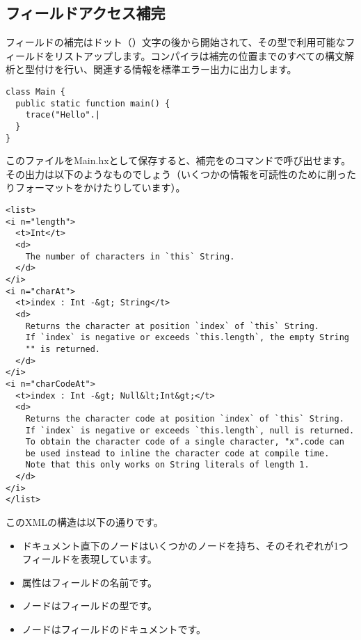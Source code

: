 \subsection{フィールドアクセス補完}
\label{cr-completion-field-access}

フィールドの補完はドット（）文字の後から開始されて、その型で利用可能なフィールドをリストアップします。コンパイラは補完の位置までのすべての構文解析と型付けを行い、関連する情報を標準エラー出力に出力します。

\begin{lstlisting}
class Main {
  public static function main() {
    trace("Hello".|
  }
}
\end{lstlisting}

このファイルをMain.hxとして保存すると、補完をのコマンドで呼び出せます。その出力は以下のようなものでしょう（いくつかの情報を可読性のために削ったりフォーマットをかけたりしています）。

\begin{lstlisting}
<list>
<i n="length">
  <t>Int</t>
  <d>
    The number of characters in `this` String.
  </d>
</i>
<i n="charAt">
  <t>index : Int -&gt; String</t>
  <d>
    Returns the character at position `index` of `this` String.
    If `index` is negative or exceeds `this.length`, the empty String
    "" is returned.
  </d>
</i>
<i n="charCodeAt">
  <t>index : Int -&gt; Null&lt;Int&gt;</t>
  <d>
    Returns the character code at position `index` of `this` String.
    If `index` is negative or exceeds `this.length`, null is returned.
    To obtain the character code of a single character, "x".code can
    be used instead to inline the character code at compile time.
    Note that this only works on String literals of length 1.
  </d>
</i>
</list>
\end{lstlisting}

このXMLの構造は以下の通りです。

\begin{itemize}
	\item ドキュメント直下のノードはいくつかのノードを持ち、そのそれぞれが1つフィールドを表現しています。
	\item {}属性はフィールドの名前です。
	\item {}ノードはフィールドの型です。
	\item {}ノードはフィールドのドキュメントです。
\end{itemize}


